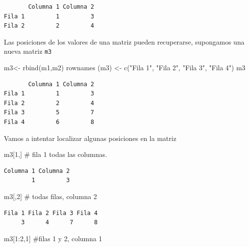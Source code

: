 \documentclass[
  letterpaper,
]{scrbook}
\newenvironment{Shaded}{\begin{snugshade}}{\end{snugshade}}
\newcommand{\CommentTok}[1]{\textcolor[rgb]{0.37,0.37,0.37}{#1}}
\newcommand{\DecValTok}[1]{\textcolor[rgb]{0.68,0.00,0.00}{#1}}
\newcommand{\FunctionTok}[1]{\textcolor[rgb]{0.28,0.35,0.67}{#1}}
\newcommand{\NormalTok}[1]{\textcolor[rgb]{0.00,0.23,0.31}{#1}}
\newcommand{\OtherTok}[1]{\textcolor[rgb]{0.00,0.23,0.31}{#1}}
\newcommand{\SpecialCharTok}[1]{\textcolor[rgb]{0.37,0.37,0.37}{#1}}
\newcommand{\StringTok}[1]{\textcolor[rgb]{0.13,0.47,0.30}{#1}}
\begin{document}
\begin{verbatim}
       Columna 1 Columna 2
Fila 1         1         3
Fila 2         2         4
\end{verbatim}

Las posiciones de los valores de una matriz pueden recuperarse,
supongamos una nueva matriz \texttt{m3}

\begin{Shaded}
\begin{Highlighting}[]
\NormalTok{m3}\OtherTok{\textless{}{-}} \FunctionTok{rbind}\NormalTok{(m1,m2)}
\FunctionTok{rownames}\NormalTok{ (m3) }\OtherTok{\textless{}{-}} \FunctionTok{c}\NormalTok{(}\StringTok{"Fila 1"}\NormalTok{, }\StringTok{"Fila 2"}\NormalTok{, }\StringTok{"Fila 3"}\NormalTok{, }\StringTok{"Fila 4"}\NormalTok{)}
\NormalTok{m3}
\end{Highlighting}
\end{Shaded}

\begin{verbatim}
       Columna 1 Columna 2
Fila 1         1         3
Fila 2         2         4
Fila 3         5         7
Fila 4         6         8
\end{verbatim}

Vamos a intentar localizar algunas posiciones en la matriz

\begin{Shaded}
\begin{Highlighting}[]
\NormalTok{m3[}\DecValTok{1}\NormalTok{,] }\CommentTok{\# fila 1 todas las columnas.}
\end{Highlighting}
\end{Shaded}

\begin{verbatim}
Columna 1 Columna 2 
        1         3 
\end{verbatim}

\begin{Shaded}
\begin{Highlighting}[]
\NormalTok{m3[,}\DecValTok{2}\NormalTok{] }\CommentTok{\# todas filas, columna 2}
\end{Highlighting}
\end{Shaded}

\begin{verbatim}
Fila 1 Fila 2 Fila 3 Fila 4 
     3      4      7      8 
\end{verbatim}

\begin{Shaded}
\begin{Highlighting}[]
\NormalTok{m3[}\DecValTok{1}\SpecialCharTok{:}\DecValTok{2}\NormalTok{,}\DecValTok{1}\NormalTok{] }\CommentTok{\#filas 1 y 2,  columna 1 }
\end{Highlighting}
\end{Shaded}
\end{document}
